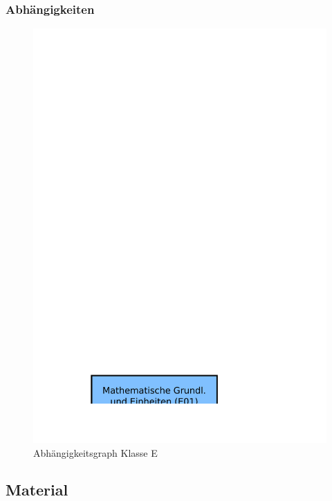\begin{frame}
  \frametitle{Abhängigkeiten}
  \begin{center}
    \begin{figure}
      \includegraphics[height=.75\textheight,width=\textwidth,keepaspectratio]{o00/Abhaengigkeitsgraph.pdf}
      \caption{Abhängigkeitsgraph Klasse E}
    \end{figure}
  \end{center}
\end{frame}


\subsection{Material}

